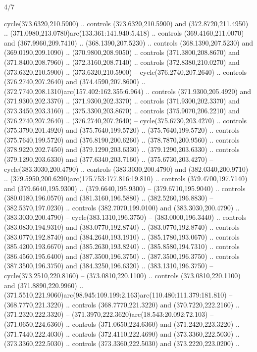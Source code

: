 \begin{flagdescription}{4/7}
\begin{scope}[shift={(0.5\flaglength,0.5\flagwidth)},scale=\flagwidth*\stretchfactor/820]
\begin{scope}[scale=1.87,xshift=-138mm,yshift=75mm]
\begin{scope}[y=0.8pt, x=0.8pt, yscale=-1, xscale=1]
\begin{scope}[cm={{1.16833,0.0,0.0,1.16833,(-0.699,1.184)}},fill=c78732e]
  cycle(373.6320,210.5900) .. controls (373.6320,210.5900) and
  (372.8720,211.4950) .. (371.0980,213.0780)arc(133.361:141.940:5.418) ..
  controls (369.4160,211.0070) and (367.9960,209.7410) .. (368.1390,207.5230) ..
  controls (368.1390,207.5230) and (369.0190,209.1090) .. (370.9800,208.9050) ..
  controls (371.3800,208.8670) and (371.8400,208.7960) .. (372.3160,208.7140) ..
  controls (372.8380,210.0270) and (373.6320,210.5900) .. (373.6320,210.5900) --
  cycle(376.2740,207.2640) .. controls (376.2740,207.2640) and
  (374.4590,207.8600) .. (372.7740,208.1310)arc(157.402:162.355:6.964) ..
  controls (371.9300,205.4920) and (371.9300,202.3370) .. (371.9300,202.3370) ..
  controls (371.9300,202.3370) and (373.3450,203.3160) .. (375.3300,203.8670) ..
  controls (375.9070,206.2210) and (376.2740,207.2640) .. (376.2740,207.2640) --
  cycle(375.6730,203.4270) .. controls (375.3790,201.4920) and
  (375.7640,199.5720) .. (375.7640,199.5720) .. controls (375.7640,199.5720) and
  (376.8190,200.6260) .. (378.7870,200.9560) .. controls (378.9220,202.7450) and
  (379.1290,203.6330) .. (379.1290,203.6330) .. controls (379.1290,203.6330) and
  (377.6340,203.7160) .. (375.6730,203.4270) -- cycle(383.3030,200.4790) ..
  controls (383.3030,200.4790) and (382.0340,200.9710) ..
  (379.5950,200.6290)arc(175.753:177.816:19.810) .. controls (379.4700,197.7140)
  and (379.6640,195.9300) .. (379.6640,195.9300) -- (379.6710,195.9040) ..
  controls (380.0180,196.0570) and (381.3160,196.5880) .. (382.5260,196.8830) --
  (382.5370,197.0230) .. controls (382.7070,199.0100) and (383.3030,200.4790) ..
  (383.3030,200.4790) -- cycle(383.1310,196.3750) -- (383.0000,196.3440) ..
  controls (383.0830,194.9310) and (383.0770,192.8740) .. (383.0770,192.8740) ..
  controls (383.0770,192.8740) and (384.2640,193.1910) .. (385.1780,193.0670) ..
  controls (385.4200,193.6670) and (385.2630,193.8240) .. (385.8580,194.7310) ..
  controls (386.4560,195.6400) and (387.3500,196.3750) .. (387.3500,196.3750) ..
  controls (387.3500,196.3750) and (384.3250,196.6320) .. (383.1310,196.3750) --
  cycle(373.2510,220.8160) -- (373.0810,220.1100) .. controls
  (373.0810,220.1100) and (371.8890,220.9960) ..
  (371.5510,221.9060)arc(98.945:109.199:2.163)arc(110.480:111.379:181.810) --
  (368.7770,221.3220) .. controls (368.7770,221.3220) and (370.7220,222.2160) ..
  (371.2320,222.3320) -- (371.3970,222.3620)arc(18.543:20.092:72.103) --
  (371.0650,224.6360) .. controls (371.0650,224.6360) and (371.2420,223.3220) ..
  (371.7440,222.4030) .. controls (372.4110,222.4690) and (373.3360,222.5030) ..
  (373.3360,222.5030) .. controls (373.3360,222.5030) and (373.2220,223.0200) ..

\end{scope}
\end{scope}
\end{scope}
\end{scope}
\end{flagdescription}
